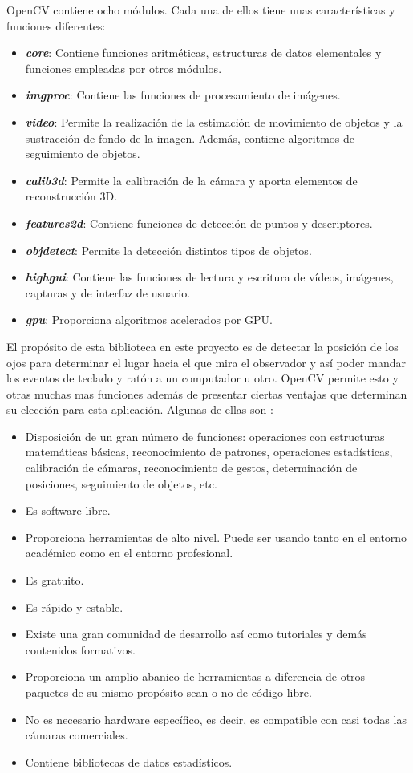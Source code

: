 OpenCV contiene ocho módulos. Cada una de ellos tiene unas características y funciones diferentes:
\begin{itemize}
\item {\bfseries\itshape core}: Contiene funciones aritméticas, estructuras de datos elementales y funciones empleadas por otros módulos.
\item {\bfseries\itshape imgproc}: Contiene las funciones de procesamiento de imágenes.
\item {\bfseries\itshape video}: Permite la realización de la estimación de movimiento de objetos y la sustracción de fondo de la imagen. Además, contiene algoritmos de seguimiento de objetos.
\item {\bfseries\itshape calib3d}: Permite la calibración de la cámara y aporta elementos de reconstrucción 3D.
\item {\bfseries\itshape features2d}: Contiene funciones de detección de puntos y descriptores.
\item {\bfseries\itshape objdetect}: Permite la detección distintos tipos de objetos.
\item {\bfseries\itshape highgui}: Contiene las funciones de lectura y escritura de vídeos, imágenes, capturas y de interfaz de usuario.
\item {\bfseries\itshape gpu}: Proporciona algoritmos acelerados por GPU.
\end{itemize}

El propósito de esta biblioteca en este proyecto es de detectar la posición de los ojos para determinar el lugar hacia el que mira el observador y así poder mandar los eventos de teclado y ratón a un computador u otro. OpenCV permite esto y otras muchas mas funciones además de presentar ciertas ventajas que determinan su elección para esta aplicación. Algunas de ellas son \citep{arevalo2004libreria}:
\begin{itemize}
\item Disposición de un gran número de funciones: operaciones con estructuras matemáticas básicas, reconocimiento de patrones, operaciones estadísticas, calibración de cámaras, reconocimiento de gestos, determinación de posiciones, seguimiento de objetos, etc. 
\item Es software libre.
\item Proporciona herramientas de alto nivel. Puede ser usando tanto en el entorno académico como en el entorno profesional. 
\item Es gratuito.
\item Es rápido y estable.
\item Existe una gran comunidad de desarrollo así como tutoriales y demás contenidos formativos.
\item Proporciona un amplio abanico de herramientas a diferencia de otros paquetes de su mismo propósito sean o no de código libre.
\item No es necesario hardware específico, es decir, es compatible con casi todas las cámaras comerciales.
\item Contiene bibliotecas de datos estadísticos.
\end{itemize}


